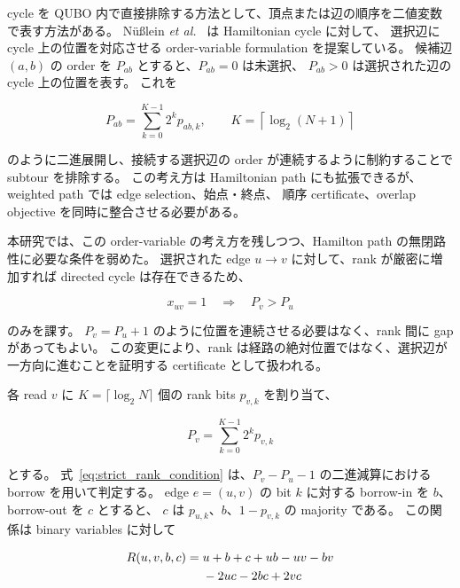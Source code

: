 cycle を QUBO 内で直接排除する方法として、頂点または辺の順序を二値変数で表す方法がある。
N{\"u}{\ss}lein \textit{et al.}\ \cite{nusslein2022qubo} は Hamiltonian cycle に対して、
選択辺に cycle 上の位置を対応させる order-variable formulation を提案している。
候補辺 $(a,b)$ の order を $P_{ab}$ とすると、$P_{ab}=0$ は未選択、
$P_{ab}>0$ は選択された辺の cycle 上の位置を表す。
これを

\begin{equation}
P_{ab}=\sum_{k=0}^{K-1}2^k p_{ab,k},
\qquad
K=\left\lceil\log_2(N+1)\right\rceil
\label{eq:nusslein_binary_order}
\end{equation}

のように二進展開し、接続する選択辺の order が連続するように制約することで subtour を排除する。
この考え方は Hamiltonian path にも拡張できるが、weighted path では edge selection、始点・終点、
順序 certificate、overlap objective を同時に整合させる必要がある。

本研究では、この order-variable の考え方を残しつつ、Hamilton path の無閉路性に必要な条件を弱めた。
選択された edge $u\rightarrow v$ に対して、rank が厳密に増加すれば directed cycle は存在できるため、

\begin{equation}
x_{uv}=1
\quad\Longrightarrow\quad
P_v>P_u
\label{eq:strict_rank_condition}
\end{equation}

のみを課す。
$P_v=P_u+1$ のように位置を連続させる必要はなく、rank 間に gap があってもよい。
この変更により、rank は経路の絶対位置ではなく、選択辺が一方向に進むことを証明する certificate として扱われる。

各 read $v$ に $K=\lceil\log_2 N\rceil$ 個の rank bits $p_{v,k}$ を割り当て、

\begin{equation}
P_v=\sum_{k=0}^{K-1}2^k p_{v,k}
\label{eq:latent_vertex_rank}
\end{equation}

とする。
式~\eqref{eq:strict_rank_condition} は、$P_v-P_u-1$ の二進減算における borrow を用いて判定する。
edge $e=(u,v)$ の bit $k$ に対する borrow-in を $b$、borrow-out を $c$ とすると、
$c$ は $p_{u,k}$、$b$、$1-p_{v,k}$ の majority である。
この関係は binary variables に対して

\begin{align}
R(u,v,b,c)
={}&u+b+c+ub-uv-bv \notag\\
&-2uc-2bc+2vc
\label{eq:borrow_quadratic_penalty}
\end{align}

